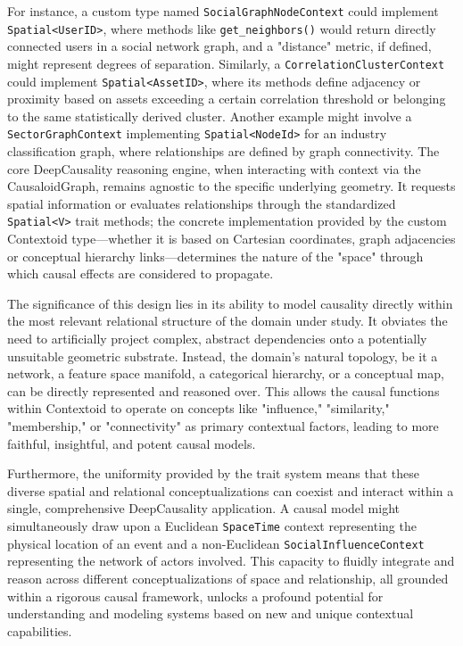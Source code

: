 For instance, a custom type named \texttt{SocialGraphNodeContext} could implement \texttt{Spatial<UserID>}, where methods like \texttt{get\_neighbors()} would return directly connected users in a social network graph, and a "distance" metric, if defined, might represent degrees of separation. Similarly, a \texttt{CorrelationClusterContext} could implement \texttt{Spatial<AssetID>}, where its methods define adjacency or proximity based on assets exceeding a certain correlation threshold or belonging to the same statistically derived cluster. Another example might involve a \texttt{SectorGraphContext} implementing \texttt{Spatial<NodeId>} for an industry classification graph, where relationships are defined by graph connectivity. The core DeepCausality reasoning engine, when interacting with context via the CausaloidGraph, remains agnostic to the specific underlying geometry. It requests spatial information or evaluates relationships through the standardized \texttt{Spatial<V>} trait methods; the concrete implementation provided by the custom Contextoid type---whether it is based on Cartesian coordinates, graph adjacencies or conceptual hierarchy links---determines the nature of the "space" through which causal effects are considered to propagate.

\newpage

The significance of this design lies in its ability to model causality directly within the most relevant relational structure of the domain under study. It obviates the need to artificially project complex, abstract dependencies onto a potentially unsuitable geometric substrate. Instead, the domain's natural topology, be it a network, a feature space manifold, a categorical hierarchy, or a conceptual map, can be directly represented and reasoned over. This allows the causal functions within Contextoid to operate on concepts like "influence," "similarity," "membership," or "connectivity" as primary contextual factors, leading to more faithful, insightful, and potent causal models.

Furthermore, the uniformity provided by the trait system means that these diverse spatial and relational conceptualizations can coexist and interact within a single, comprehensive DeepCausality application. A causal model might simultaneously draw upon a Euclidean \texttt{SpaceTime} context representing the physical location of an event and a non-Euclidean \texttt{SocialInfluenceContext} representing the network of actors involved. This capacity to fluidly integrate and reason across different conceptualizations of space and relationship, all grounded within a rigorous causal framework, unlocks a profound potential for understanding and modeling systems based on new and unique contextual capabilities.


